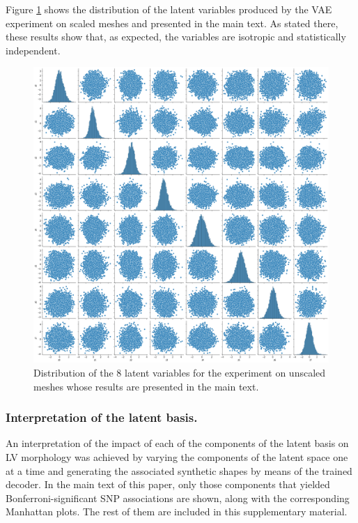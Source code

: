 \documentclass[fleqn,10pt]{wlscirep}
\begin{document}
Figure \ref{fig:z_distribution} shows the distribution of the latent variables produced by the VAE experiment on scaled meshes and presented in the main text. As stated there, these results show that, as expected, the variables are isotropic and statistically independent.

\begin{figure}
 \centering
 \includegraphics[width=\textwidth]{figs/supplementary/z_distribution.png}
 \caption{Distribution of the 8 latent variables for the experiment on unscaled meshes whose results are presented in the main text.}
 \label{fig:z_distribution}
\end{figure}

\subsubsection{Interpretation of the latent basis.} An interpretation of the impact of each of the components of the latent basis on LV morphology was achieved by varying the components of the latent space one at a time and generating the associated synthetic shapes by means of the trained decoder. %
In the main text of this paper, only those components that yielded Bonferroni-significant SNP associations are shown, along with the corresponding Manhattan plots. The rest of them are included in this supplementary material.
\end{document}

